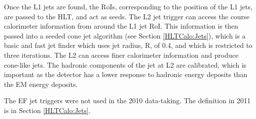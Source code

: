 Once the L1 jets are found, the RoIs, corresponding to the position of the L1 jets, are passed to the HLT, and act as seeds. 
The L2 jet trigger can access the course calorimeter information from around the L1 jet RoI. 
This information is then passed into a seeded cone jet algorithm (see Section \ref{HLTCalo:Jets}), which is a basic and fast jet finder which uses jet radius, R, of 0.4, and which is restricted to three iterations.
The L2 can access finer calorimeter information and produce cone-like jets.
The hadronic components of the jet at L2 are calibrated, which is important as the detector has a lower response to hadronic energy deposits than the EM energy deposits. 

The EF jet triggers were not used in the 2010 data-taking. 
The definition in 2011 is in Section \ref{HLTCalo:Jets}.



